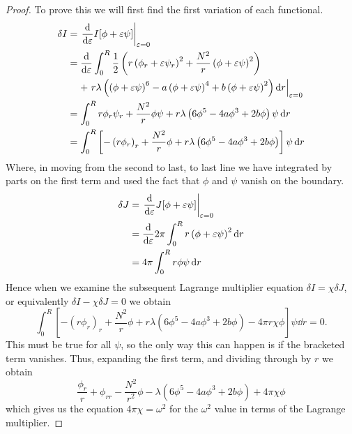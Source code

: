 \begin{proof}
To prove this we will first find the first variation of each functional.
\begin{align}
\delta I & = \left.\dv{\varepsilon}I[\phi + \varepsilon\psi]\right|_{\varepsilon = 0} \nonumber\\
 & = \dv{\varepsilon}\int_0^R \frac{1}{2}\left(r\left(\phi_r + \varepsilon\psi_r\right)^2 + \frac{N^2}{r}\left(\phi + \varepsilon\psi\right)^2\right) \nonumber\\
 & \phantom{=}\,\,+ \left.r\lambda\left(\left(\phi + \varepsilon\psi\right)^6 - a\left(\phi + \varepsilon\psi\right)^4 + b\left(\phi + \varepsilon\psi\right)^2\right)\dd{r}\right|_{\varepsilon = 0} \nonumber\\
 & = \int_0^R r\phi_r\psi_r + \frac{N^2}{r}\phi\psi + r\lambda\left(6\phi^5 - 4a\phi^3 + 2b\phi\right)\psi\dd{r} \nonumber\\
 & = \int_0^R\left[-\left(r\phi_r\right)_r + \frac{N^2}{r}\phi + r\lambda\left(6\phi^5 - 4a\phi^3 + 2b\phi\right)\right]\psi\dd{r}
\end{align}
Where, in moving from the second to last, to last line we have integrated by parts on the first term and used the fact that $\phi$ and $\psi$ vanish on the boundary.
\begin{align}
\delta J & = \left.\dv{\varepsilon}J[\phi + \varepsilon\psi]\right|_{\varepsilon = 0} \nonumber \\
 & = \dv{\varepsilon}2\pi\int_0^Rr\left(\phi + \varepsilon\psi\right)^2\dd{r} \nonumber \\
 & = 4\pi\int_0^Rr\phi\psi\dd{r}
\end{align}
Hence when we examine the subsequent Lagrange multiplier equation $\delta I = \chi\delta J$, or equivalently $\delta I - \chi\delta J = 0$ we obtain
\begin{equation}
\int_0^R\left[-\left(r\phi_r\right)_r + \frac{N^2}{r}\phi + r\lambda\left(6\phi^5 - 4a\phi^3 + 2b\phi\right) - 4\pi r\chi \phi\right]\psi\dd{r} = 0.
\end{equation}
This must be true for all $\psi$, so the only way this can happen is if the bracketed term vanishes. Thus, expanding the first term, and dividing through by $r$ we obtain
\begin{equation}
\frac{\phi_r}{r} + \phi_{rr} - \frac{N^2}{r^2}\phi - \lambda\left(6\phi^5 - 4a\phi^3 + 2b\phi\right) + 4\pi\chi \phi
\end{equation}
which gives us the equation $4\pi\chi = \omega^2$ for the $\omega^2$ value in terms of the Lagrange multiplier.
\end{proof}

